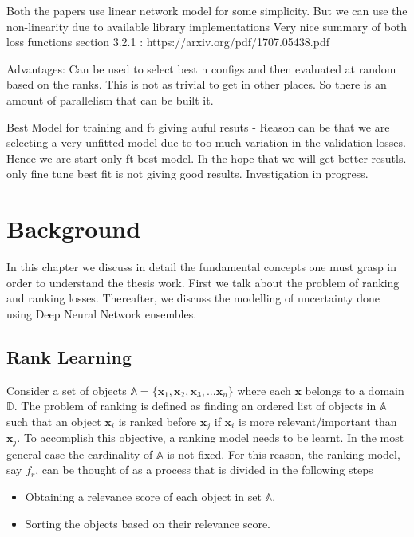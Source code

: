 \documentclass[12pt, twoside, ngerman]{report}
\begin{document}
    Both the papers use linear network model for some simplicity. But we can use the non-linearity due to available library
        implementations
    Very nice summary of both loss functions section 3.2.1 : https://arxiv.org/pdf/1707.05438.pdf 

Advantages:
    Can be used to select best n configs and then evaluated at random based on the ranks. This is not as trivial to get in other
    places. So there is an amount of parallelism that can be built it.

Best Model for training and ft giving auful resuts - Reason can be that we are selecting a very unfitted model due to too much variation in the validation losses.
Hence we are start only ft best model. Ih the hope that we will get better resutls.
only fine tune best fit is not giving good results. Investigation in progress. 

\fi


\chapter{Background}

In this chapter we discuss in detail the fundamental concepts one must grasp in order to understand the thesis work.
First we talk about the problem of ranking and ranking losses.
Thereafter, we discuss the modelling of uncertainty done using Deep Neural Network ensembles.

\section{Rank Learning}\label{sec:ranklearning}

Consider a set of objects $\mathbb{A} = \{\textbf{x}_1, \textbf{x}_2, \textbf{x}_3, ... \textbf{x}_n\}$ where each $\textbf{x}$ belongs to a domain $\mathbb{D}$.
The problem of ranking is defined as finding an ordered list of objects in $\mathbb{A}$ such that an object $\textbf{x}_i$ is ranked before $\textbf{x}_j$ if $\textbf{x}_i$  is more relevant/important than $\textbf{x}_j$.
To accomplish this objective,  a ranking model needs to be learnt.
In the most general case the cardinality of $\mathbb{A}$ is not fixed.
For this reason, the ranking model, say $f_r$, can be thought of as a process that is divided in the following steps~\cite{procedureforrankinginintro}
\begin{itemize}
\item Obtaining a relevance score of each object in set $\mathbb{A}$.
\item Sorting the objects based on their relevance score. 
\end{itemize}
\end{document}

